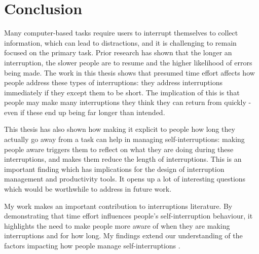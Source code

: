 \section{Conclusion}
Many computer-based tasks require users to interrupt themselves to collect information, which can lead to distractions, and it is challenging to remain focused on the primary task. Prior research has shown that the longer an interruption, the slower people are to resume and the higher likelihood of errors being made. The work in this thesis shows that presumed time effort affects how people address these types of interruptions: they address interruptions immediately if they except them to be short. The implication of this is that people may make many interruptions they think they can return from quickly - even if these end up being far longer than intended.

This thesis has also shown how making it explicit to people how long they actually go away from a task can help in managing self-interruptions: making people aware triggers them to reflect on what they are doing during these interruptions, and makes them reduce the length of interruptions. This is an important finding which has implications for the design of interruption management and productivity tools. It opens up a lot of interesting questions which would be worthwhile to address in future work. 

My work makes an important contribution to interruptions literature. By demonstrating that time effort influences people’s self-interruption behaviour, it highlights the need to make people more aware of when they are making interruptions and for how long. My findings extend our understanding of the factors impacting how people manage self-interruptions . 

